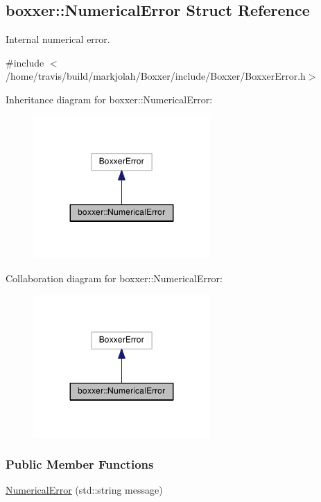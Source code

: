 \hypertarget{structboxxer_1_1NumericalError}{}\subsection{boxxer\+:\+:Numerical\+Error Struct Reference}
\label{structboxxer_1_1NumericalError}


Internal numerical error.  




{\ttfamily \#include $<$/home/travis/build/markjolah/\+Boxxer/include/\+Boxxer/\+Boxxer\+Error.\+h$>$}



Inheritance diagram for boxxer\+:\+:Numerical\+Error\+:\nopagebreak
\begin{figure}[H]
\begin{center}
\leavevmode
\includegraphics[width=191pt]{structboxxer_1_1NumericalError__inherit__graph}
\end{center}
\end{figure}


Collaboration diagram for boxxer\+:\+:Numerical\+Error\+:\nopagebreak
\begin{figure}[H]
\begin{center}
\leavevmode
\includegraphics[width=191pt]{structboxxer_1_1NumericalError__coll__graph}
\end{center}
\end{figure}
\subsubsection*{Public Member Functions}
\begin{DoxyCompactItemize}
\item 
\hyperlink{structboxxer_1_1NumericalError_a35fca9d555108f8721314e938004dff5}{Numerical\+Error} (std\+::string message)
\end{DoxyCompactItemize}


